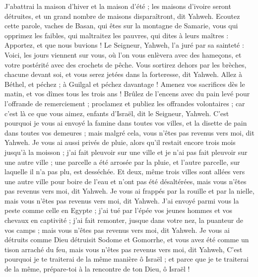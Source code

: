 \begin{multicols}{2}
J’abattrai la maison d'hiver et la maison d'été ; les maisons d'ivoire seront détruites, et un grand nombre de maisons disparaîtront, dit Yahweh.
\VerseOne{}Ecoutez cette parole, vaches de Basan, qui êtes sur la montagne de Samarie, vous qui opprimez les faibles, qui maltraitez les pauvres, qui dites à leurs maîtres : Apportez, et que nous buvions !
Le Seigneur, Yahweh, l’a juré par sa sainteté : Voici, les jours viennent sur vous, où l’on vous enlèvera avec des hameçons, et votre postérité avec des crochets de pêche.
Vous sortirez dehors par les brèches, chacune devant soi, et vous serez jetées dans la forteresse, dit Yahweh.
Allez à Béthel, et péchez ; à Guilgal et péchez davantage ! Amenez vos sacrifices dès le matin, et vos dîmes tous les trois ans !
Brûlez de l’encens avec du pain levé pour l’offrande de remerciement ; proclamez et publiez les offrandes volontaires ; car c’est là ce que vous aimez, enfants d'Israël, dit le Seigneur, Yahweh.
C'est pourquoi je vous ai envoyé la famine dans toutes vos villes, et la disette de pain dans toutes vos demeures ; mais malgré cela, vous n’êtes pas revenus vers moi, dit Yahweh.
Je vous ai aussi privés de pluie, alors qu’il restait encore trois mois jusqu'à la moisson ; j'ai fait pleuvoir sur une ville et je n'ai pas fait pleuvoir sur une autre ville ; une parcelle a été arrosée par la pluie, et l'autre parcelle, sur laquelle il n'a pas plu, est desséchée.
Et deux, même trois villes sont allées vers une autre ville pour boire de l'eau et n'ont pas été désaltérées, mais vous n’êtes pas revenus vers moi, dit Yahweh.
Je vous ai frappés par la rouille et par la nielle, mais vous n’êtes pas revenus vers moi, dit Yahweh.
J’ai envoyé parmi vous la peste comme celle en Egypte ; j'ai tué par l'épée vos jeunes hommes et vos chevaux en captivité ; j'ai fait remonter, jusque dans votre nez, la puanteur de vos camps ; mais vous n’êtes pas revenus vers moi, dit Yahweh.
Je vous ai détruits comme Dieu détruisit Sodome et Gomorrhe, et vous avez été comme un tison arraché du feu, mais vous n’êtes pas revenus vers moi, dit Yahweh,
C'est pourquoi je te traiterai de la même manière ô Israël ; et parce que je te traiterai de la même, prépare-toi à la rencontre de ton Dieu, ô Israël !

\end{multicols}
